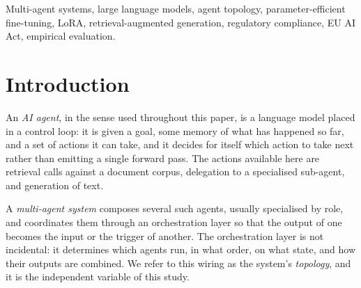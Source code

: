 \documentclass[journal,10pt,compsoc,onecolumn]{IEEEtran}
\begin{document}
\begin{abstract}
left judged quality statistically indistinguishable from the untuned control
($p = 1.00$ on all three topologies, $|\delta| \leq 0.08$) while reducing the
expert abstention rate from $22.3\%$ to $1.6\%$, and
that this behavioural change was bought at close to double the end-to-end
latency ($244$--$249$\,s against $124$--$129$\,s; $p \leq 8.3\times10^{-7}$,
$\delta \geq 0.92$) and significantly higher token cost ($p \leq 0.004$),
with no significant latency difference among topologies within either arm.
We further report that on a
single GPU nominal concurrency buys almost nothing: three co-resident experts
generating simultaneously achieved a measured speedup of only
$1.07\times$ over sequential execution, so ``parallel'' topologies pay
coordination cost for a structural property the hardware does not deliver.
Because the judge (DeepSeek V4 Flash) now generates none of the answers it
scores, the self-preference-bias caveat that constrained our earlier
single-versus-multi study no longer applies.
\end{abstract}

\begin{IEEEkeywords}
Multi-agent systems, large language models, agent topology, parameter-efficient
fine-tuning, LoRA, retrieval-augmented generation, regulatory compliance, EU AI
Act, empirical evaluation.
\end{IEEEkeywords}

\section{Introduction}

An \emph{AI agent}, in the sense used throughout this paper, is a language model
placed in a control loop: it is given a goal, some memory of what has happened so
far, and a set of actions it can take, and it decides for itself which action to
take next rather than emitting a single forward pass. The actions available here
are retrieval calls against a document corpus, delegation to a specialised
sub-agent, and generation of text.

A \emph{multi-agent system} composes several such agents, usually specialised by
role, and coordinates them through an orchestration layer so that the output of
one becomes the input or the trigger of another. The orchestration layer is not
incidental: it determines which agents run, in what order, on what state, and how
their outputs are combined. We refer to this wiring as the system's
\emph{topology}, and it is the independent variable of this study.
\end{document}
